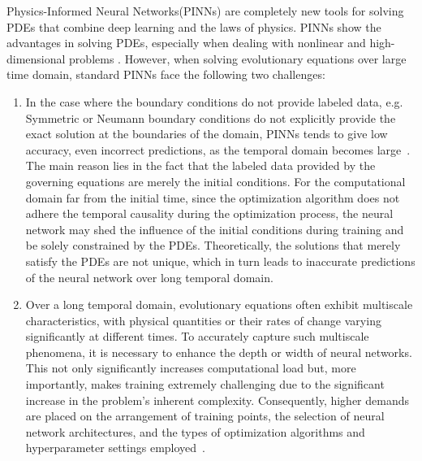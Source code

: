 \documentclass[preprint]{elsarticle}
\numberwithin{table}{section}
\numberwithin{equation}{section}
\numberwithin{figure}{section}
\begin{document}
\begin{CJK}{UTF8}{gbsn}
Physics-Informed Neural Networks(PINNs) \cite{712178,RAISSI2019686}   {are completely new tools}  for solving PDEs that combine deep learning and the laws of physics. PINNs show  the advantages in solving PDEs, especially when dealing with nonlinear and high-dimensional problems \cite{Karniadakis}. However, when solving evolutionary equations over large time domain,  standard PINNs face the following two challenges:
\begin{enumerate}
    \item 
In the case where the boundary conditions do not provide labeled data, e.g. {Symmetric or Neumann}   boundary conditions do not explicitly provide the exact  solution  at the boundaries of the domain, PINNs tends to give low accuracy, even incorrect predictions, as the temporal domain  becomes large~\cite{SOIBAM2024125480,PENWARDEN2023112464}.
The main reason lies in the fact that the label{ed} data provided by the governing equations are merely the initial conditions. For the computational domain far from the initial time, since the optimization algorithm does not  {adhere} the temporal causality during the optimization process, the neural network  {may shed} the influence of the initial conditions during training and be solely constrained by the PDEs. Theoretically, the solutions that merely satisfy the PDEs are not unique, which in turn leads to  {inaccurate  predictions} of the neural network over long temporal domain.
 


    \item 
 
Over a
long  temporal domain, evolutionary equations often exhibit multiscale characteristics, with physical quantities or their rates of change varying significantly at different times. To accurately capture such multiscale phenomena,  {it is necessary} to enhance the depth or width of neural networks. This not only significantly increases computational   load but, more importantly, 
  makes training extremely challenging  due to the significant increase in the problem's inherent complexity. Consequently, higher demands  {are placed on the arrangement of} training points, the selection of neural network architectures, and the types of optimization algorithms and  {hyperparameter settings} employed~\cite{Wang2020OnTE,WANG2024113112}.


\end{enumerate}

 


\end{CJK}
\end{document}
